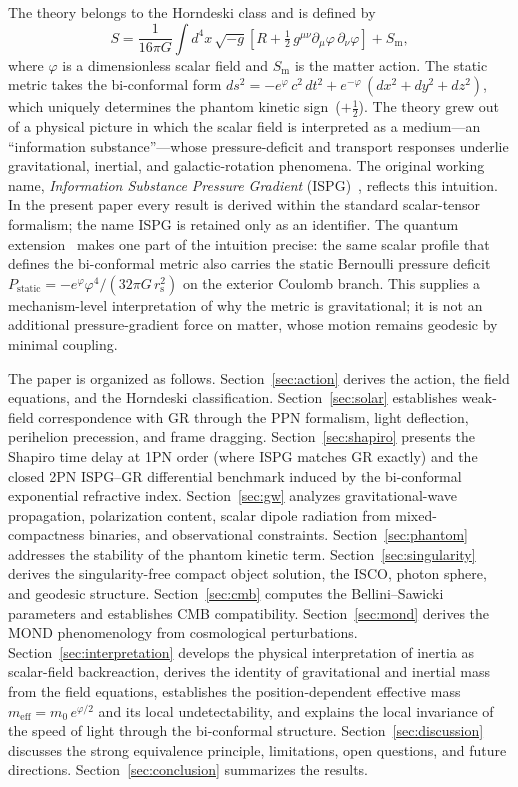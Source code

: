 \documentclass[aps,prd,onecolumn,superscriptaddress,nofootinbib,showpacs,12pt]{revtex4-2}
\newcommand{\half}{\tfrac{1}{2}}
\newcommand{\rs}{r_{\mathrm{s}}}
\begin{document}
The theory belongs to the Horndeski class and is defined by
\begin{equation}\label{eq:action_intro}
  S = \frac{1}{16\pi G}\int d^{4}x\,\sqrt{-g}\left[
    R + \half\,g^{\mu\nu}\partial_{\mu}\varphi\,
    \partial_{\nu}\varphi \right] + S_{\mathrm{m}},
\end{equation}
where $\varphi$ is a dimensionless scalar field and
$S_{\mathrm{m}}$ is the matter action.  The static metric
takes the bi-conformal form
$ds^{2} = -e^{\varphi}\,c^{2}\,dt^{2} +
e^{-\varphi}\,(dx^{2}+dy^{2}+dz^{2})$,
which uniquely determines the phantom kinetic sign~($+\half$).
The theory grew out of a physical picture in which the
scalar field is interpreted as a medium---an
``information substance''---whose pressure-deficit and
transport responses underlie gravitational, inertial, and
galactic-rotation phenomena.  The
original working name, \emph{Information Substance
Pressure Gradient} (ISPG)~\cite{Lotishvili2026}, reflects
this intuition.  In the present paper every result is
derived within the standard scalar-tensor formalism;
the name ISPG is retained only as an identifier.
The quantum extension~\cite{Lotishvili2026Q} makes one
part of the intuition precise: the same scalar profile
that defines the bi-conformal metric also carries the
static Bernoulli pressure deficit
$P_{\mathrm{static}} =
-e^{\varphi}\varphi^{4}/(32\pi G\,\rs^{2})$
on the exterior Coulomb branch.  This supplies a
mechanism-level interpretation of why the metric is
gravitational; it is not an additional pressure-gradient
force on matter, whose motion remains geodesic by minimal
coupling.

The paper is organized as follows.  Section~\ref{sec:action}
derives the action, the field equations, and the Horndeski
classification.  Section~\ref{sec:solar} establishes
weak-field correspondence with GR through the PPN formalism,
light deflection, perihelion precession, and frame dragging.
Section~\ref{sec:shapiro} presents the Shapiro time delay
at 1PN order (where ISPG matches GR exactly) and the closed
2PN ISPG--GR differential benchmark induced by the
bi-conformal exponential refractive index.
Section~\ref{sec:gw} analyzes gravitational-wave propagation,
polarization content, scalar dipole radiation from
mixed-compactness binaries, and observational constraints.
Section~\ref{sec:phantom} addresses the stability of the
phantom kinetic term.
Section~\ref{sec:singularity} derives the singularity-free
compact object solution, the ISCO, photon sphere, and
geodesic structure.
Section~\ref{sec:cmb} computes the Bellini--Sawicki parameters
and establishes CMB compatibility.
Section~\ref{sec:mond} derives the MOND phenomenology from
cosmological perturbations.
Section~\ref{sec:interpretation} develops the physical
interpretation of inertia as scalar-field backreaction,
derives the identity of gravitational and inertial mass
from the field equations, establishes the position-dependent
effective mass $m_{\mathrm{eff}} = m_{0}\,e^{\varphi/2}$
and its local undetectability, and explains the local
invariance of the speed of light through the bi-conformal
structure.
Section~\ref{sec:discussion} discusses the strong
equivalence principle, limitations, open questions,
and future directions.
Section~\ref{sec:conclusion} summarizes the results.
\end{document}
